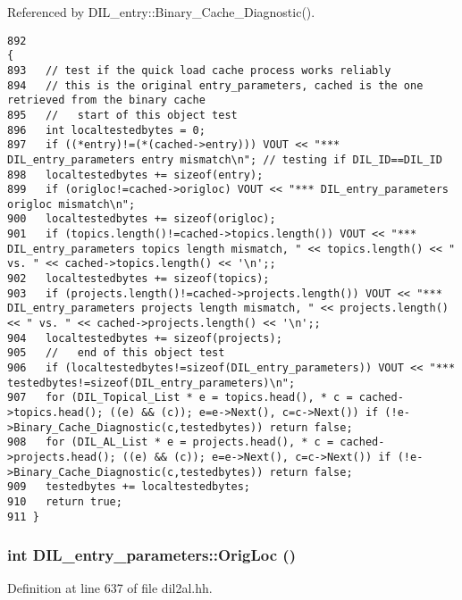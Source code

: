 Referenced by DIL\_\-entry::Binary\_\-Cache\_\-Diagnostic().



\footnotesize\begin{verbatim}892                                                                                                    {
893   // test if the quick load cache process works reliably
894   // this is the original entry_parameters, cached is the one retrieved from the binary cache
895   //   start of this object test
896   int localtestedbytes = 0;
897   if ((*entry)!=(*(cached->entry))) VOUT << "*** DIL_entry_parameters entry mismatch\n"; // testing if DIL_ID==DIL_ID
898   localtestedbytes += sizeof(entry);
899   if (origloc!=cached->origloc) VOUT << "*** DIL_entry_parameters origloc mismatch\n";
900   localtestedbytes += sizeof(origloc);
901   if (topics.length()!=cached->topics.length()) VOUT << "*** DIL_entry_parameters topics length mismatch, " << topics.length() << " vs. " << cached->topics.length() << '\n';;
902   localtestedbytes += sizeof(topics);
903   if (projects.length()!=cached->projects.length()) VOUT << "*** DIL_entry_parameters projects length mismatch, " << projects.length() << " vs. " << cached->projects.length() << '\n';;
904   localtestedbytes += sizeof(projects);
905   //   end of this object test
906   if (localtestedbytes!=sizeof(DIL_entry_parameters)) VOUT << "*** testedbytes!=sizeof(DIL_entry_parameters)\n";
907   for (DIL_Topical_List * e = topics.head(), * c = cached->topics.head(); ((e) && (c)); e=e->Next(), c=c->Next()) if (!e->Binary_Cache_Diagnostic(c,testedbytes)) return false;
908   for (DIL_AL_List * e = projects.head(), * c = cached->projects.head(); ((e) && (c)); e=e->Next(), c=c->Next()) if (!e->Binary_Cache_Diagnostic(c,testedbytes)) return false;
909   testedbytes += localtestedbytes;
910   return true;
911 }
\end{verbatim}\normalsize 
{}
\subsubsection{\setlength{\rightskip}{0pt plus 5cm}int DIL\_\-entry\_\-parameters::Orig\-Loc ()\hspace{0.3cm}{\tt  [inline]}}\label{classDIL__entry__parameters_a5}




Definition at line 637 of file dil2al.hh.


